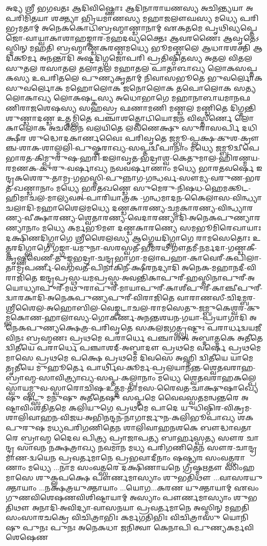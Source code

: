 𑌅𑌦𑍍𑌯 𑌶𑍍𑌰𑍀 𑌭𑌗𑌵𑌤𑌃 𑌆𑌦𑌿𑌵𑌿𑌷𑍍𑌣𑍋𑌃 𑌆𑌦𑌿𑌨𑌾𑌰𑌾𑌯𑌣𑌸𑍍𑌯 𑌅𑌚𑌿𑌨𑍍𑌤𑍍𑌯𑌯𑌾 𑌅𑌪𑌰𑌿𑌮𑌿𑌤𑌯𑌾 𑌶𑌕𑍍𑌤𑍍𑌯𑌾 𑌭𑍍𑌰𑌿𑌯𑌮𑌾𑌣𑌸𑍍𑌯 𑌮𑌹𑌾𑌜𑌲𑍗𑌘𑌸𑍍𑌯 𑌮𑌧𑍍𑌯𑍇
𑌪𑌰𑌿𑌭𑍍𑌰𑌮𑌤𑌾𑌮𑍍 𑌅𑌨𑍇𑌕𑌕𑍋𑌟𑌿𑌬𑍍𑌰𑌹𑍍𑌮𑌾𑌣𑍍𑌡𑌾𑌨𑌾𑌮𑍍 𑌏𑌕𑌤𑌮𑍇 𑌪𑍃𑌥𑌿𑌵𑍍𑌯𑌪𑍍𑌤𑍇𑌜𑍋-𑌵𑌾𑌯𑍍𑌵𑌾𑌕𑌾𑌶𑌾𑌹𑌙𑍍𑌕𑌾𑌰-𑌮𑌹𑌦𑌵𑍍𑌯𑌕𑍍𑌤𑍈𑌃 𑌆𑌵𑌰𑌣𑍈𑌃
𑌆𑌵𑍃𑌤𑍇𑌽𑌸𑍍𑌮𑌿𑌨𑍍 𑌮𑌹𑌤𑌿 𑌬𑍍𑌰𑌹𑍍𑌮𑌾𑌣𑍍𑌡𑌕𑌰𑌣𑍍𑌡𑌮𑌧𑍍𑌯𑍇 𑌭𑍂𑌮𑌣𑍍𑌡𑌲𑍇 𑌆𑌧𑌾𑌰𑌶𑌕𑍍𑌤𑌿 𑌆𑌦𑌿𑌕𑍂𑌰𑍍𑌮 𑌅𑌨𑌨𑍍𑌤𑌾𑌦𑌿 𑌅𑌷𑍍𑌟𑌦𑌿𑌗𑍍𑌗𑌜𑍋𑌪𑌰𑌿
𑌪𑍍𑌰𑌤𑌿𑌷𑍍𑌠𑌿𑌤𑌸𑍍𑌯 𑌅𑌤𑌲 𑌵𑌿𑌤𑌲 𑌸𑍁𑌤𑌲 𑌰𑌸𑌾𑌤𑌲 𑌤𑌲𑌾𑌤𑌲 𑌮𑌹𑌾𑌤𑌲 𑌪𑌾𑌤𑌾𑌳𑌾𑌖𑍍𑌯 𑌲𑍋𑌕𑌸𑌪𑍍𑌤𑌕𑌸𑍍𑌯 𑌉𑌪𑌰𑌿𑌤𑌲𑍇 𑌪𑍁𑌣𑍍𑌯𑌕𑍃𑌤𑌾𑌮𑍍 𑌨𑌿𑌵𑌾𑌸𑌭𑍂𑌤𑍇
𑌭𑍁𑌵𑌰𑍍𑌲𑍋𑌕 𑌸𑍁𑌵𑌰𑍍𑌲𑍋𑌕 𑌮𑌹𑍋𑌲𑍋𑌕 𑌜𑌨𑍋𑌲𑍋𑌕 𑌤𑌪𑍋𑌲𑍋𑌕 𑌸𑌤𑍍𑌯𑌲𑍋𑌕𑌾𑌖𑍍𑌯 𑌲𑍋𑌕𑌷𑌟𑍍𑌕𑌸𑍍𑌯 𑌅𑌧𑍋𑌭𑌾𑌗𑍇 𑌮𑌹𑌾𑌨𑌾𑌳𑌾𑌯𑌮𑌾𑌨𑌫𑌣𑌿𑌰𑌾𑌜𑌶𑍇𑌷𑌸𑍍𑌯 𑌸𑌹𑌸𑍍𑌰
𑌫𑌣𑌾𑌮𑌣𑌿 𑌮𑌣𑍍𑌡𑌲 𑌮𑌣𑍍𑌡𑌿𑌤𑍇 𑌦𑌿𑌗𑍍𑌦𑌨𑍍𑌤𑌿 𑌶𑍁𑌣𑍍𑌡𑌾𑌦𑌣𑍍𑌡 𑌉𑌤𑍍𑌤𑌮𑍍𑌭𑌿𑌤𑍇 𑌪𑌞𑍍𑌚𑌾𑌶𑌤𑍍𑌕𑍋𑌟𑌿𑌯𑍋𑌜𑌨 𑌵𑌿𑌸𑍍𑌤𑍀𑌰𑍍𑌣𑍇 𑌲𑍋𑌕𑌾𑌲𑍋𑌕 𑌅𑌚𑌲𑍇𑌨
𑌵𑌲𑌯𑌿𑌤𑍇 𑌲𑌵𑌣𑍇𑌕𑍍𑌷𑍁 𑌸𑍁𑌰𑌾𑌸𑌰𑍍𑌪𑌿 𑌦𑌧𑌿 𑌕𑍍𑌷𑍀𑌰 𑌶𑍁𑌦𑍍𑌧𑍋𑌦𑌕𑌾𑌰𑍍𑌣𑌵𑍈𑌃 𑌪𑌰𑌿𑌵𑍃𑌤𑍇
𑌜𑌮𑍍𑌬𑍂-𑌪𑍍𑌲𑌕𑍍𑌷-𑌕𑍁𑌶-𑌕𑍍𑌰𑍗𑌞𑍍𑌚-𑌶𑌾𑌕-𑌶𑌾𑌲𑍍𑌮𑌲𑌿-𑌪𑍁𑌷𑍍𑌕𑌰𑌾𑌖𑍍𑌯-𑌸𑌪𑍍𑌤𑌦𑍍𑌵𑍀𑌪𑌾𑌨𑌾𑌂 𑌮𑌧𑍍𑌯𑍇 𑌜𑌮𑍍𑌬𑍂𑌦𑍍𑌵𑍀𑌪𑍇
𑌭𑌾𑌰𑌤-𑌕𑌿𑌮𑍍𑌪𑍁𑌰𑍁𑌷-𑌹𑌰𑌿-𑌇𑌲𑌾𑌵𑍃𑌤-𑌭𑌦𑍍𑌰𑌾𑌶𑍍𑌵-𑌕𑍇𑌤𑍁𑌮𑌾𑌲-𑌹𑌿𑌰𑌣𑍍𑌮𑌯-𑌰𑌮𑌣𑌕-𑌕𑍁𑌰𑍁-𑌵𑌰𑍍𑌷𑌾𑌖𑍍𑌯 𑌨𑌵𑌵𑌰𑍍𑌷𑌾𑌣𑌾𑌂 𑌮𑌧𑍍𑌯𑍇 𑌭𑌾𑌰𑌤𑌵𑌰𑍍𑌷𑍇
𑌇𑌨𑍍𑌦𑍍𑌰𑌕𑌶𑍇𑌰𑍁-𑌤𑌾𑌮𑍍𑌰-𑌗𑌭𑌸𑍍𑌤𑌿-𑌪𑍁𑌨𑍍𑌨𑌾𑌗-𑌗𑌨𑍍𑌧𑌰𑍍𑌵-𑌸𑍗𑌮𑍍𑌯-𑌵𑌰𑍁𑌣-𑌭𑌰𑌤-𑌖𑌣𑍍𑌡𑌾𑌨𑌾𑌂 𑌮𑌧𑍍𑌯𑍇 𑌭𑌰𑌤𑌖𑌣𑍍𑌡𑍇
𑌸𑍁𑌮𑍇𑌰𑍁-𑌨𑌿𑌷𑌧-𑌹𑍇𑌮𑌕𑍂𑌟-𑌹𑌿𑌮𑌾𑌚𑌲-𑌮𑌾𑌲𑍍𑌯𑌵𑌤𑍍-𑌪𑌾𑌰𑌿𑌯𑌾𑌤𑍍𑌰𑌕 -𑌗𑌨𑍍𑌧𑌮𑌾𑌦𑌨-𑌕𑍈𑌲𑌾𑌸-𑌵𑌿𑌨𑍍𑌧𑍍𑌯𑌾𑌚𑌲𑌾𑌦𑌿-𑌮𑌹𑌾𑌶𑍈𑌲𑌮𑌧𑍍𑌯𑍇
𑌦𑌣𑍍𑌡𑌕𑌾𑌰𑌣𑍍𑌯-𑌚𑌮𑍍𑌪𑌕𑌾𑌰𑌣𑍍𑌯-𑌵𑌿𑌨𑍍𑌧𑍍𑌯𑌾𑌰𑌣𑍍𑌯-𑌵𑍀𑌕𑍍𑌷𑌾𑌰𑌣𑍍𑌯-𑌶𑍍𑌵𑍇𑌤𑌾𑌰𑌣𑍍𑌯-𑌵𑍇𑌦𑌾𑌰𑌣𑍍𑌯𑌾𑌦𑌿-𑌅𑌨𑍇𑌕𑌪𑍁𑌣𑍍𑌯𑌾𑌰𑌣𑍍𑌯𑌾𑌨𑌾𑌂 𑌮𑌧𑍍𑌯𑍇
𑌕𑌰𑍍𑌮𑌭𑍂𑌮𑍗 𑌦𑌣𑍍𑌡𑌕𑌾𑌰𑌣𑍍𑌯𑍇 𑌸𑌮𑌭𑍂𑌮𑌿𑌰𑍇𑌖𑌾𑌯𑌾𑌃 𑌦𑌕𑍍𑌷𑌿𑌣𑌦𑌿𑌗𑍍𑌭𑌾𑌗𑍇 𑌶𑍍𑌰𑍀𑌶𑍈𑌲𑌸𑍍𑌯 𑌆𑌗𑍍𑌨𑍇𑌯𑌦𑌿𑌗𑍍𑌭𑌾𑌗𑍇 𑌰𑌾𑌮𑌸𑍇𑌤𑍋𑌃 𑌉𑌤𑍍𑌤𑌰𑌦𑌿𑌗𑍍𑌭𑌾𑌗𑍇
𑌗𑌙𑍍𑌗𑌾-𑌯𑌮𑍁𑌨𑌾-𑌸𑌰𑌸𑍍𑌵𑌤𑍀-𑌭𑍀𑌮𑌰𑌥𑍀-𑌗𑍗𑌤𑌮𑍀-𑌨𑌰𑍍𑌮𑌦𑌾-𑌗𑌣𑍍𑌡𑌕𑍀-𑌕𑍃𑌷𑍍𑌣𑌵𑍇𑌣𑍀-𑌤𑍁𑌙𑍍𑌗𑌭𑌦𑍍𑌰𑌾-𑌚𑌨𑍍𑌦𑍍𑌰𑌭𑌾𑌗𑌾-𑌮𑌲𑌾𑌪𑌹𑌾-𑌕𑌾𑌵𑍇𑌰𑍀-𑌕𑌪𑌿𑌲𑌾-𑌤𑌾𑌮𑍍𑌰𑌪𑌰𑍍𑌣𑍀-𑌵𑍇𑌗𑌵𑌤𑍀-𑌪𑌿𑌨𑌾𑌕𑌿𑌨𑍀-𑌕𑍍𑌷𑍀𑌰𑌨𑌦𑍍𑌯𑌾𑌦𑌿
𑌅𑌨𑍇𑌕-𑌮𑌹𑌾𑌨𑌦𑍀-𑌵𑌿𑌰𑌾𑌜𑌿𑌤𑍇
𑌇𑌨𑍍𑌦𑍍𑌰𑌪𑍍𑌰𑌸𑍍𑌥-𑌯𑌮𑌪𑍍𑌰𑌸𑍍𑌥-𑌅𑌵𑌨𑍍𑌤𑌿𑌕𑌾𑌪𑍁𑌰𑍀-𑌹𑌸𑍍𑌤𑌿𑌨𑌾𑌪𑍁𑌰𑍀-𑌅𑌯𑍋𑌧𑍍𑌯𑌾𑌪𑍁𑌰𑍀-𑌮𑌥𑍁𑌰𑌾𑌪𑍁𑌰𑍀-𑌮𑌾𑌯𑌾𑌪𑍁𑌰𑍀-𑌕𑌾𑌶𑍀𑌪𑍁𑌰𑍀-𑌕𑌾𑌞𑍍𑌚𑍀𑌪𑍁𑌰𑍀-𑌦𑍍𑌵𑌾𑌰𑌕𑌾𑌦𑌿-𑌅𑌨𑍇𑌕𑌪𑍁𑌣𑍍𑌯𑌪𑍁𑌰𑍀-𑌵𑌿𑌰𑌾𑌜𑌿𑌤𑍇
𑌵𑌾𑌰𑌾𑌣𑌸𑍀-𑌚𑌿𑌦𑌮𑍍𑌬𑌰-𑌶𑍍𑌰𑍀𑌶𑍈𑌲-𑌅𑌹𑍋𑌬𑌿𑌲-𑌵𑍇𑌙𑍍𑌕𑌟𑌾𑌚𑌲-𑌰𑌾𑌮𑌸𑍇𑌤𑍁-𑌜𑌮𑍍𑌬𑍁𑌕𑍇𑌶𑍍𑌵𑌰-𑌕𑍁𑌮𑍍𑌭𑌕𑍋𑌣-𑌹𑌾𑌲𑌾𑌸𑍍𑌯-𑌗𑍋𑌕𑌰𑍍𑌣-𑌅𑌨𑌨𑍍𑌤𑌶𑌯𑌨-𑌗𑌯𑌾-𑌪𑍍𑌰𑌯𑌾𑌗𑌾𑌦𑌿
𑌅𑌨𑍇𑌕𑌪𑍁𑌣𑍍𑌯𑌕𑍍𑌷𑍇𑌤𑍍𑌰-𑌪𑌰𑌿𑌵𑍃𑌤𑍇 𑌸𑌕𑌲𑌜𑌗𑌤𑍍𑌸𑍍𑌰𑌷𑍍𑌟𑍁𑌃 𑌪𑌰𑌾𑌰𑍍𑌧𑌦𑍍𑌵𑌯𑌜𑍀𑌵𑌿𑌨𑌃 𑌬𑍍𑌰𑌹𑍍𑌮𑌣𑌃 𑌪𑍍𑌰𑌥𑌮𑍇 𑌪𑌰𑌾𑌰𑍍𑌧𑍇 𑌪𑌞𑍍𑌚𑌾𑌶𑌤𑍍
𑌅𑌬𑍍𑌦𑌾𑌤𑍍𑌮𑌕𑍇 𑌅𑌤𑍀𑌤𑍇 𑌦𑍍𑌵𑌿𑌤𑍀𑌯𑍇 𑌪𑌰𑌾𑌰𑍍𑌧𑍇 𑌪𑌞𑍍𑌚𑌾𑌶𑌦𑍍-𑌅𑌬𑍍𑌦𑌾𑌦𑍗 𑌪𑍍𑌰𑌥𑌮𑍇 𑌵𑌰𑍍𑌷𑍇 𑌪𑍍𑌰𑌥𑌮𑍇 𑌮𑌾𑌸𑍇 𑌪𑍍𑌰𑌥𑌮𑍇 𑌪𑌕𑍍𑌷𑍇 𑌪𑍍𑌰𑌥𑌮𑍇
𑌦𑌿𑌵𑌸𑍇 𑌅𑌹𑍍𑌨𑌿 𑌦𑍍𑌵𑌿𑌤𑍀𑌯𑍇 𑌯𑌾𑌮𑍇 𑌤𑍃𑌤𑍀𑌯𑍇 𑌮𑍁𑌹𑍂𑌰𑍍𑌤𑍇
𑌪𑌾𑌰𑍍𑌥𑌿𑌵-𑌕𑍂𑌰𑍍𑌮-𑌪𑍍𑌰𑌲𑌯𑌾𑌨𑌨𑍍𑌤-𑌶𑍍𑌵𑍇𑌤𑌵𑌰𑌾𑌹-𑌬𑍍𑌰𑌾𑌹𑍍𑌮-𑌸𑌾𑌵𑌿𑌤𑍍𑌰𑍍𑌯𑌾𑌖𑍍𑌯-𑌸𑌪𑍍𑌤-𑌕𑌲𑍍𑌪𑌾𑌨𑌾𑌂 𑌮𑌧𑍍𑌯𑍇 𑌶𑍍𑌵𑍇𑌤𑌵𑌰𑌾𑌹𑌕𑌲𑍍𑌪𑍇
𑌸𑍍𑌵𑌾𑌯𑌮𑍍𑌭𑍁𑌵-𑌸𑍍𑌵𑌾𑌰𑍋𑌚𑌿𑌷-𑌉𑌤𑍍𑌤𑌮-𑌤𑌾𑌮𑌸-𑌰𑍈𑌵𑌤-𑌚𑌾𑌕𑍍𑌷𑍁𑌷𑌾𑌖𑍍𑌯𑍇𑌷𑍁 𑌷𑌟𑍍𑌸𑍁 𑌮𑌨𑍁𑌷𑍁 𑌅𑌤𑍀𑌤𑍇𑌷𑍁 𑌸𑌪𑍍𑌤𑌮𑍇 𑌵𑍈𑌵𑌸𑍍𑌵𑌤𑌮𑌨𑍍𑌵𑌨𑍍𑌤𑌰𑍇
𑌅𑌷𑍍𑌟𑌾𑌵𑌿𑌂𑌶𑌤𑌿𑌤𑌮𑍇 𑌕𑌲𑌿𑌯𑍁𑌗𑍇 𑌪𑍍𑌰𑌥𑌮𑍇 𑌪𑌾𑌦𑍇 𑌯𑍁𑌧𑌿𑌷𑍍𑌠𑌿𑌰-𑌵𑌿𑌕𑍍𑌰𑌮-𑌶𑌾𑌲𑌿𑌵𑌾𑌹𑌨-𑌵𑌿𑌜𑌯-𑌅𑌭𑌿𑌨𑌨𑍍𑌦𑌨-𑌨𑌾𑌗𑌾𑌰𑍍𑌜𑍁𑌨-𑌕𑌲𑌿𑌭𑍂𑌪𑌾𑌖𑍍𑌯
𑌶𑌕𑌪𑍁𑌰𑍁𑌷 𑌮𑌧𑍍𑌯𑌪𑌰𑌿𑌗𑌣𑌿𑌤𑍇𑌨 𑌶𑌾𑌲𑌿𑌵𑌾𑌹𑌨𑌶𑌕𑍇 𑌬𑍗𑌦𑍍𑌧𑌾𑌵𑌤𑌾𑌰𑍇 𑌬𑍍𑌰𑌾𑌹𑍍𑌮 𑌦𑍈𑌵 𑌪𑌿𑌤𑍍𑌰𑍍𑌯 𑌪𑍍𑌰𑌾𑌜𑌾𑌪𑌤𑍍𑌯 𑌬𑌾𑌰𑍍𑌹𑌸𑍍𑌪𑌤𑍍𑌯 𑌸𑍗𑌰 𑌚𑌾𑌨𑍍𑌦𑍍𑌰
𑌸𑌾𑌵𑌨 𑌨𑌕𑍍𑌷𑌤𑍍𑌰𑌾𑌖𑍍𑌯 𑌨𑌵𑌮𑌾𑌨 𑌮𑌧𑍍𑌯 𑌪𑌰𑌿𑌗𑌣𑌿𑌤𑍇𑌨 𑌸𑍗𑌰-𑌚𑌾𑌨𑍍𑌦𑍍𑌰𑌮𑌾𑌣-𑌦𑍍𑌵𑌯𑍇𑌨 𑌪𑍍𑌰𑌵𑌰𑍍𑌤𑌮𑌾𑌨𑍇 𑌪𑍍𑌰𑌭𑌵𑌾𑌦𑍀𑌨𑌾𑌂 𑌷𑌷𑍍𑌟𑍍𑌯𑌾𑌃
𑌸𑌂𑌵𑌤𑍍𑌸𑌰𑌾𑌣𑌾𑌂 𑌮𑌧𑍍𑌯𑍇 ...𑌨𑌾𑌮 𑌸𑌂𑌵𑌤𑍍𑌸𑌰𑍇 𑌦𑌕𑍍𑌷𑌿𑌣𑌾𑌯𑌨𑍇 𑌗𑍍𑌰𑍀𑌷𑍍𑌮𑌋𑌤𑍗 𑌸𑌿𑌂𑌹 𑌮𑌾𑌸𑍇 𑌶𑍁𑌕𑍍𑌲𑌪𑌕𑍍𑌷𑍇 𑌪𑍗𑌰𑍍𑌣𑌮𑌾𑌸𑍍𑌯𑌾𑌂 𑌶𑍁𑌭𑌤𑌿𑌥𑍗
...𑌵𑌾𑌸𑌰𑌯𑍁𑌕𑍍𑌤𑌾𑌯𑌾𑌂 ...𑌨𑌕𑍍𑌷𑌤𑍍𑌰𑌯𑍁𑌕𑍍𑌤𑌾𑌯𑌾𑌂 ...𑌯𑍋𑌗...𑌕𑌰𑌣 𑌯𑍁𑌕𑍍𑌤𑌾𑌯𑌾𑌮𑍍 𑌏𑌵𑌂𑌗𑍁𑌣𑌵𑌿𑌶𑍇𑌷𑌣𑌵𑌿𑌶𑌿𑌷𑍍𑌟𑌾𑌯𑌾𑌮𑍍 𑌅𑌸𑍍𑌯𑌾𑌂
𑌪𑍗𑌰𑍍𑌣𑌮𑌾𑌸𑍍𑌯𑌾𑌂 𑌶𑍁𑌭𑌤𑌿𑌥𑍗  𑌅𑌨𑌾𑌦𑌿-𑌅𑌵𑌿𑌦𑍍𑌯𑌾-𑌵𑌾𑌸𑌨𑌯𑌾 𑌪𑍍𑌰𑌵𑌰𑍍𑌤𑌮𑌾𑌨𑍇 𑌅𑌸𑍍𑌮𑌿𑌨𑍍 𑌮𑌹𑌤𑌿 𑌸𑌂𑌸𑌾𑌰𑌚𑌕𑍍𑌰𑍇 𑌵𑌿𑌚𑌿𑌤𑍍𑌰𑌾𑌭𑌿𑌃
𑌕𑌰𑍍𑌮𑌗𑌤𑌿𑌭𑌿𑌃 𑌵𑌿𑌚𑌿𑌤𑍍𑌰𑌾𑌸𑍁 𑌯𑍋𑌨𑌿𑌷𑍁 𑌪𑍁𑌨𑌃 𑌪𑍁𑌨𑌃 𑌅𑌨𑍇𑌕𑌧𑌾 𑌜𑌨𑌿𑌤𑍍𑌵𑌾 𑌕𑍇𑌨𑌾𑌪𑌿 𑌪𑍁𑌣𑍍𑌯𑌕𑌰𑍍𑌮𑌵𑌿𑌶𑍇𑌷𑍇𑌣
